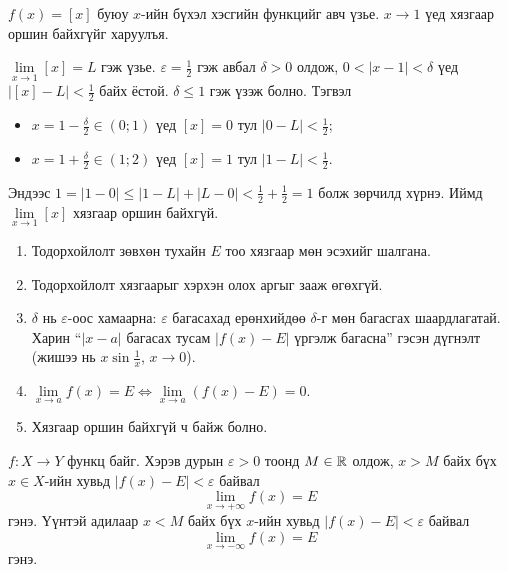 \begin{example}
$f(x) = [x]$ буюу $x$-ийн бүхэл хэсгийн функцийг авч үзье. $x \to 1$ үед хязгаар оршин байхгүйг харуулъя.

$\lim\limits_{x\to 1}[x]=L$ гэж үзье. $\varepsilon=\tfrac12$ гэж авбал $\delta>0$ олдож, $0<|x-1|<\delta$ үед
$|[x]-L|<\tfrac12$ байх ёстой. $\delta\le1$ гэж үзэж болно. Тэгвэл
\begin{itemize}
\item $x=1-\tfrac\delta2\in(0;1)$ үед $[x]=0$ тул $|0-L|<\tfrac12$;
\item $x=1+\tfrac\delta2\in(1;2)$ үед $[x]=1$ тул $|1-L|<\tfrac12$.
\end{itemize}
Эндээс $1=|1-0|\le|1-L|+|L-0|<\tfrac12+\tfrac12=1$ болж зөрчилд хүрнэ.
Иймд $\lim\limits_{x\to 1}[x]$ хязгаар оршин байхгүй.
\end{example}
\begin{remark}
\begin{enumerate}
\item Тодорхойлолт зөвхөн тухайн $E$ тоо хязгаар мөн эсэхийг шалгана.
\item Тодорхойлолт хязгаарыг хэрхэн олох аргыг зааж өгөхгүй.
\item $\delta$ нь $\varepsilon$-оос хамаарна: $\varepsilon$ багасахад ерөнхийдөө $\delta$-г мөн багасгах шаардлагатай.
      Харин ``$|x-a|$ багасах тусам $|f(x)-E|$ үргэлж багасна'' гэсэн дүгнэлт 
      (жишээ нь $x\sin\frac1x$, $x\to0$).
\item $\lim\limits_{x\to a}f(x)=E \iff \lim\limits_{x\to a}(f(x)-E)=0$.
\item Хязгаар оршин байхгүй ч байж болно.
\end{enumerate}
\end{remark}

\begin{definition}
$f:X\to Y$ функц байг. Хэрэв дурын $\varepsilon>0$ тоонд $M\in\mathbb{R}$ олдож, $x>M$ байх бүх $x\in X$-ийн хувьд $|f(x)-E|<\varepsilon$ байвал
\[
\lim_{x \to +\infty} f(x) = E
\]
гэнэ. Үүнтэй адилаар $x<M$ байх бүх $x$-ийн хувьд $|f(x)-E|<\varepsilon$ байвал
\[
\lim_{x \to -\infty} f(x) = E
\]
гэнэ.
\end{definition}

